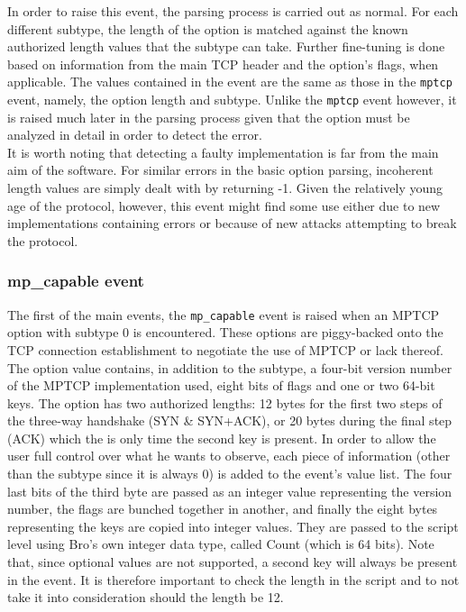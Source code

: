 \documentclass[12pt, a4paper, oneside]{article} %
\begin{document}
In order to raise this event, the parsing process is carried out as normal. For each  different subtype, the length of the option is matched against the known authorized length values that the subtype can take. Further fine-tuning is done based on information from the main TCP header and the option's flags, when applicable. The values contained in the event are the same as those in the \texttt{mptcp} event, namely, the option length and subtype. Unlike the \texttt{mptcp} event however, it is raised much later in the parsing process given that the option must be analyzed in detail in order to detect the error.\\

It is worth noting that detecting a faulty implementation is far from the main aim of the software. For similar errors in the basic option parsing, incoherent length values are simply dealt with by returning -1. Given the relatively young age of the protocol, however, this event might find some use either due to new implementations containing errors or because of new attacks attempting to break the protocol.

\subsubsection{mp\_capable event}
The first of the main events, the \texttt{mp\_capable} event is raised when an MPTCP option with subtype 0 is encountered. These options are piggy-backed onto the TCP connection establishment to negotiate the use of MPTCP or lack thereof. The option value contains, in addition to the subtype, a four-bit version number of the MPTCP implementation used, eight bits of flags and one or two 64-bit keys. The option has two authorized lengths: 12 bytes for the first two steps of the three-way handshake (SYN \& SYN+ACK), or 20 bytes during the final step (ACK) which the is only time the second key is present. In order to allow the user full control over what he wants to observe, each piece of information (other than the subtype since it is always 0) is added to the event's value list. The four last bits of the third byte are passed as an integer value representing the version number, the flags are bunched together in another, and finally the eight bytes representing the keys are copied into integer values.  They are passed to the script level using Bro's own integer data type, called Count (which is 64 bits). Note that, since optional values are not supported, a second key will always be present in the event. It is therefore important to check the length in the script and to not take it into consideration should the length be 12.\\
\end{document}
